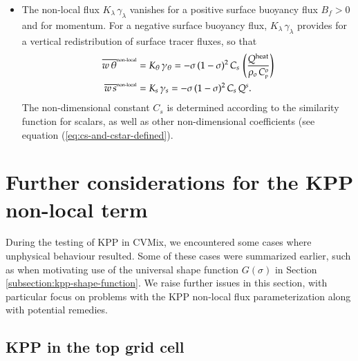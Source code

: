 \begin{itemize}
\item The non-local flux $K_{\lambda} \, \gamma_{\lambda}$ vanishes
  for a positive surface buoyancy flux $B_{f} > 0$ and for momentum.
  For a negative surface buoyancy flux, $K_{\lambda} \,
  \gamma_{\lambda}$ provides for a vertical redistribution of surface
  tracer fluxes, so that
\begin{subequations}
\begin{align}
\overline{w \, \theta}^{\mbox{\tiny non-local}} &= K_{\theta}  \, \gamma_{\theta} = 
 - \sigma \, (1-\sigma)^{2} \, C_{s} \, \left( \frac{ Q^{\mbox{\scriptsize heat}}}{ \rho_{o}  \, C_{\mbox{\tiny p}}^{o} } \right)
\label{eq:non-local-flux-kpp-param-temp-summary}
\\
\overline{w \, s}^{\mbox{\tiny non-local}} &= K_{s}  \, \gamma_{s}  = 
 -\sigma \, (1-\sigma)^{2}  \, C_{s} \,  Q^{s}.
\label{eq:non-local-flux-kpp-param-scalar-summary}
\end{align}
\end{subequations}
The non-dimensional constant $C_{s}$ is determined according to the
similarity function for scalars, as well as other non-dimensional
coefficients (see equation (\ref{eq:cs-and-cstar-defined}).

\end{itemize}


\section{Further considerations for the KPP non-local term}
\label{section:kernals-of-behaviour}

During the testing of KPP in CVMix, we encountered some cases where
unphysical behaviour resulted.  Some of these cases were summarized
earlier, such as when motivating use of the universal shape function
$G(\sigma)$ in Section \ref{subsection:kpp-shape-function}.  We raise
further issues in this section, with particular focus on problems with
the KPP non-local flux parameterization along with potential remedies.


\subsection{KPP in the top grid cell}
\label{subsection:kpp-surface-cell-tendency}

